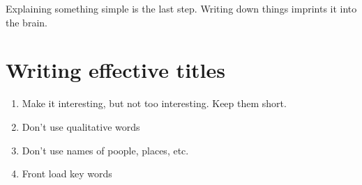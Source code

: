 \documentclass{article}
\newtheorem{one minute paper}[theorem]{One Minute Paper}
\begin{document}
Explaining something simple is the last step. Writing down things imprints it into the brain. 

\section*{Writing effective titles}

\begin{enumerate}
    \item Make it interesting, but not too interesting. Keep them short. 
    \item Don't use qualitative words
    \item Don't use names of poople, places, etc.
    \item Front load key words
\end{enumerate}
\end{document}
